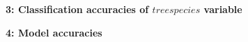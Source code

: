 \documentclass[a4paper, 12pt, titlepage]{scrartcl}
\begin{document}

\textbf{\large 3: Classification accuracies of $treespecies$ variable}
\newpage




\textbf{\large 4: Model accuracies}\\

\newpage




\end{document}
